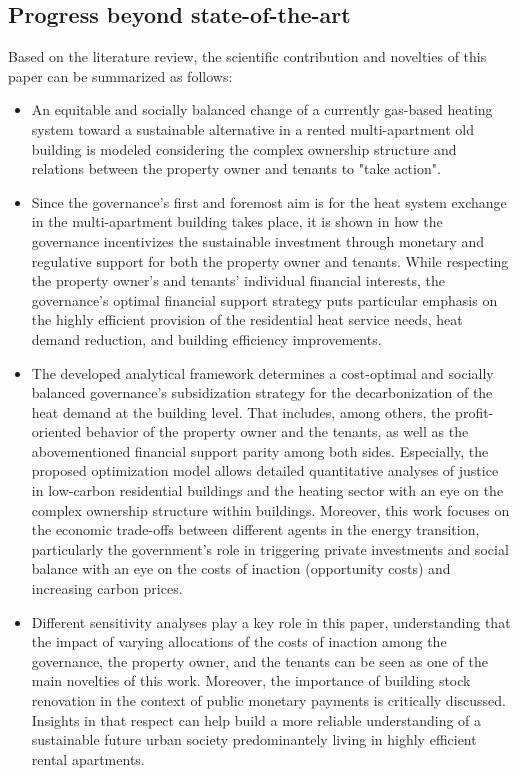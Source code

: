 \subsection{Progress beyond state-of-the-art}\label{novelties}
Based on the literature review, the scientific contribution and novelties of this paper can be summarized as follows:
\begin{itemize}
	\item An equitable and socially balanced change of a currently gas-based heating system toward a sustainable alternative in a rented multi-apartment old building is modeled considering the complex ownership structure and relations between the property owner and tenants to "take action".
	\item Since the governance's first and foremost aim is for the heat system exchange in the multi-apartment building takes place, it is shown in how the governance incentivizes the sustainable investment through monetary and regulative support for both the property owner and tenants. While respecting the property owner's and tenants' individual financial interests, the governance's optimal financial support strategy puts particular emphasis on the highly efficient provision of the residential heat service needs, heat demand reduction, and building efficiency improvements.
	\item The developed analytical framework determines a cost-optimal and socially balanced governance’s subsidization strategy for the decarbonization of the heat demand at the building level. That includes, among others, the profit-oriented behavior of the property owner and the tenants, as well as the abovementioned financial support parity among both sides.  Especially, the proposed optimization model allows detailed quantitative analyses of justice in low-carbon residential buildings and the heating sector with an eye on the complex ownership structure within buildings. Moreover, this work focuses on the economic trade-offs between different agents in the energy transition, particularly the government’s role in triggering private investments and social balance with an eye on the costs of inaction (opportunity costs) and increasing carbon prices.	
	\item Different sensitivity analyses play a key role in this paper, understanding that the impact of varying allocations of the costs of inaction among the governance, the property owner, and the tenants can be seen as one of the main novelties of this work. Moreover, the importance of building stock renovation in the context of public monetary payments is critically discussed. Insights in that respect can help build a more reliable understanding of a sustainable future urban society predominantely living in highly efficient rental apartments.
\end{itemize}